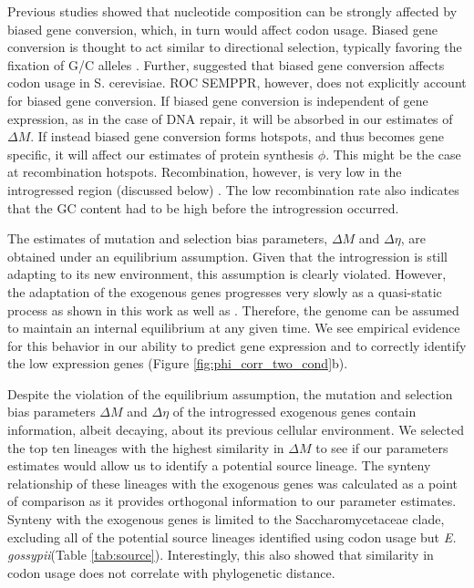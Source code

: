 \documentclass[doublespacing,linenumbers]{bmcart-modified}
\newcommand{\gossypii}{\textit{E. gossypii}\xspace}
\newcommand{\ROC}{ROC SEMPPR\xspace}
\newcommand{\GC}{GC content\xspace}
\newcommand{\DM}{\ensuremath{{\Delta M}}\xspace}
\newcommand{\DE}{\ensuremath{{\Delta \eta}}\xspace}
\begin{document}
Previous studies showed that nucleotide composition can be strongly affected by biased gene conversion, which, in turn would affect codon usage.
Biased gene conversion is thought to act similar to directional selection, typically favoring the fixation of G/C alleles \cite{nagylaki1983a, nagylaki1983b}. 
Further, \cite[Harrison \& Charlesworth]{harrison2011} suggested that biased gene conversion affects codon usage in S. cerevisiae.
\ROC, however, does not explicitly account for biased gene conversion.
If biased gene conversion is independent of gene expression, as in the case of DNA repair, it will be absorbed in our estimates of \DM.
If instead biased gene conversion forms hotspots, and thus becomes gene specific, it will affect our estimates of protein synthesis $\phi$.
This might be the case at recombination hotspots.
Recombination, however, is very low in the introgressed region (discussed below) \cite{payen2009, brion2017}.
The low recombination rate also indicates that the \GC had to be high before the introgression occurred.

The estimates of mutation and selection bias parameters, \DM and \DE, are obtained under an equilibrium assumption.
Given that the introgression is still adapting to its new environment, this assumption is clearly violated.
However, the adaptation of the exogenous genes progresses very slowly as a quasi-static process as shown in this work as well as \cite{friedrich2015}.
Therefore, the genome can be assumed to maintain an internal equilibrium at any given time. 
We see empirical evidence for this behavior in our ability to predict gene expression and to correctly identify the low expression genes (Figure \ref{fig:phi_corr_two_cond}b). 

Despite the violation of the equilibrium assumption, the mutation and selection bias parameters \DM and \DE of the introgressed exogenous genes contain information, albeit decaying, about its previous cellular environment.
We selected the top ten lineages with the highest similarity in \DM to see if our parameters estimates would allow us to identify a potential source lineage.
The synteny relationship of these lineages with the exogenous genes was calculated as a point of comparison as it provides orthogonal information to our parameter estimates.
Synteny with the exogenous genes is limited to the Saccharomycetaceae clade, excluding all of the potential source lineages identified using codon usage but \gossypii (Table \ref{tab:source}).
Interestingly, this also showed that similarity in codon usage does not correlate with phylogenetic distance.
\end{document}

